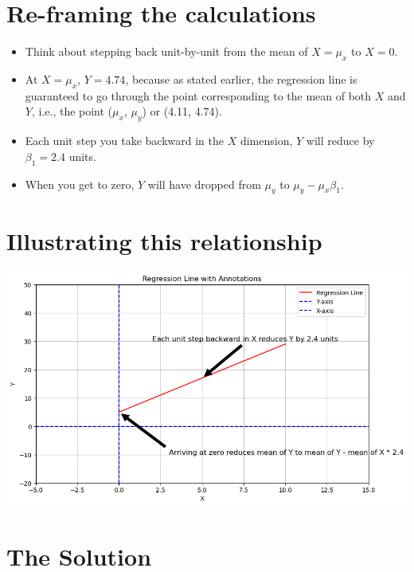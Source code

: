 \documentclass[
]{article}
\begin{document}
\hypertarget{re-framing-the-calculations}{%
\section{Re-framing the
calculations}\label{re-framing-the-calculations}}

\begin{itemize}
\item
  Think about stepping back unit-by-unit from the mean of \(X = \mu_x\)
  to \(X = 0\).
\item
  At \(X =\mu_x\), \(Y = 4.74\), because as stated earlier, the
  regression line is guaranteed to go through the point corresponding to
  the mean of both \(X\) and \(Y\), i.e., the point (\(\mu_x\),
  \(\mu_y\)) or (4.11, 4.74).
\item
  Each unit step you take backward in the \(X\) dimension, \(Y\) will
  reduce by \(\beta_1 = 2.4\) units.
\item
  When you get to zero, \(Y\) will have dropped from \(\mu_y\) to
  \(\mu_y - \mu_x\beta_1\).
\end{itemize}

\hypertarget{illustrating-this-relationship}{%
\section{Illustrating this
relationship}\label{illustrating-this-relationship}}

\includegraphics{images/regression_equation.png}

\hypertarget{the-solution}{%
\section{The Solution}\label{the-solution}}
\end{document}
